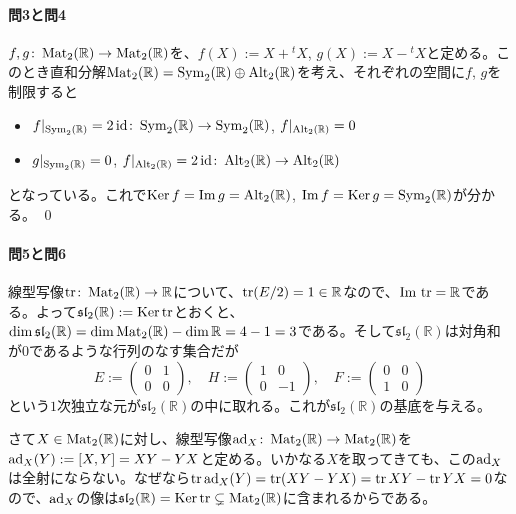 \paragraph{問3と問4}

$f, g\colon \operatorname{Mat}_2(\mathbb{R}) \rightarrow \operatorname{Mat}_2(\mathbb{R})$を、$f(X) := X + {}^t X$, $g(X) := X - {}^t X$と定める。このとき直和分解$\operatorname{Mat}_2(\mathbb{R}) = \operatorname{Sym}_2(\mathbb{R}) \oplus \operatorname{Alt}_2(\mathbb{R})$を考え、それぞれの空間に$f$, $g$を制限すると
\begin{itemize}
\item $f|_{\operatorname{Sym}_2(\mathbb{R})} = 2\operatorname{id}\colon \operatorname{Sym}_2(\mathbb{R})\rightarrow \operatorname{Sym}_2(\mathbb{R})$, $f|_{\operatorname{Alt}_2(\mathbb{R})} = 0$
\item $g|_{\operatorname{Sym}_2(\mathbb{R})} = 0$, $f|_{\operatorname{Alt}_2(\mathbb{R})} = 2\operatorname{id}\colon \operatorname{Alt}_2(\mathbb{R})\rightarrow \operatorname{Alt}_2(\mathbb{R})$
\end{itemize}
となっている。これで$\operatorname{Ker} f = \mathrm{Im}\, g = \operatorname{Alt}_2(\mathbb{R})$, $\mathrm{Im}\, f = \operatorname{Ker} g = \operatorname{Sym}_2(\mathbb{R})$が分かる。 \qed

\paragraph{問5と問6}

線型写像$\operatorname{tr}\colon \operatorname{Mat}_2(\mathbb{R}) \rightarrow \mathbb{R}$について、$\operatorname{tr} (E/2) = 1 \in \mathbb{R}$なので、$\mathrm{Im}\, \operatorname{tr} = \mathbb{R}$である。よって$\mathfrak{sl}_2(\mathbb{R}) := \operatorname{Ker} \operatorname{tr}$とおくと、$\dim \mathfrak{sl}_2(\mathbb{R}) = \dim \operatorname{Mat}_2(\mathbb{R}) - \dim \mathbb{R} = 4 - 1 = 3$である。そして$\mathfrak{sl}_2(\mathbb{R})$は対角和が$0$であるような行列のなす集合だが
\[
E :=
\begin{pmatrix}
0 & 1 \\
0 & 0
\end{pmatrix}, \quad
H :=
\begin{pmatrix}
1 & 0 \\
0 & -1
\end{pmatrix}, \quad
F :=
\begin{pmatrix}
0 & 0 \\
1 & 0
\end{pmatrix}
\]
という$1$次独立な元が$\mathfrak{sl}_2(\mathbb{R})$の中に取れる。これが$\mathfrak{sl}_2(\mathbb{R})$の基底を与える。

さて$X \in \operatorname{Mat}_2(\mathbb{R})$に対し、線型写像$\operatorname{ad}_X\colon\operatorname{Mat}_2(\mathbb{R})\rightarrow\operatorname{Mat}_2(\mathbb{R})$を$\operatorname{ad}_X(Y) := [X, Y] = XY - YX$と定める。いかなる$X$を取ってきても、この$\operatorname{ad}_X$は全射にならない。なぜなら$\operatorname{tr} \operatorname{ad}_X(Y) = \operatorname{tr}(XY - YX) = \operatorname{tr} XY - \operatorname{tr} YX = 0$なので、$\operatorname{ad}_X$の像は$\mathfrak{sl}_2(\mathbb{R}) = \operatorname{Ker} \operatorname{tr}\subsetneq\operatorname{Mat}_2(\mathbb{R})$に含まれるからである。

